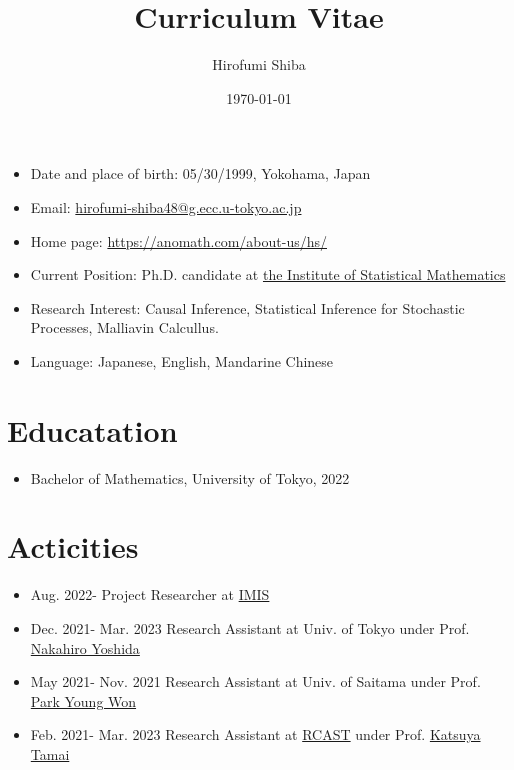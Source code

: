 \documentclass[uplatex,dvipdfmx]{jsarticle}
\title{Curriculum Vitae}
\author{Hirofumi Shiba}
\date{\today}
\begin{document}
\maketitle

\begin{itemize}
    \item Date and place of birth: 05/30/1999, Yokohama, Japan
    \item Email: \href{mailto:hirofumi-shiba48@g.ecc.u-tokyo.ac.jp}{hirofumi-shiba48@g.ecc.u-tokyo.ac.jp}
    \item Home page: \url{https://anomath.com/about-us/hs/}
    \item Current Position: Ph.D. candidate at \href{https://www.ism.ac.jp/index_e.html}{the Institute of Statistical Mathematics}
    \item Research Interest: Causal Inference, Statistical Inference for Stochastic Processes, Malliavin Calcullus.
    \item Language: Japanese, English, Mandarine Chinese
\end{itemize}

\section*{Educatation}

\begin{itemize}
    \item Bachelor of Mathematics, University of Tokyo, 2022
\end{itemize}

\section*{Acticities}

\begin{itemize}
    \item Aug. 2022- Project Researcher at \href{http://imis.jp/}{IMIS}
    \item Dec. 2021- Mar. 2023 Research Assistant at Univ. of Tokyo under Prof. \href{https://www.ms.u-tokyo.ac.jp/~nakahiro/hp-naka-e}{Nakahiro Yoshida}
    \item May 2021- Nov. 2021 Research Assistant at Univ. of Saitama under Prof. \href{https://www.u-tokyo.ac.jp/focus/ja/people/k0001_01178.html}{Park Young Won}
    \item Feb. 2021- Mar. 2023 Research Assistant at \href{https://www.rcast.u-tokyo.ac.jp/en/}{RCAST} under Prof. \href{https://www.u-tokyo.ac.jp/focus/en/people/people002854.html}{Katsuya Tamai}
\end{itemize}
\end{document}
